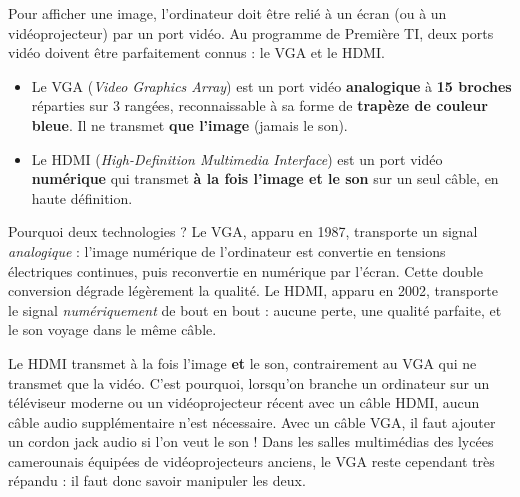 \documentclass[11pt]{article}
\newcommand{\cle}[1]{{\popxbold\color{popdark}#1}}
\newcounter{popsec}
\newcounter{popsub}
\newcommand{\courssub}[1]{%
  \stepcounter{popsub}%
  \par\vspace{9pt}\noindent{\popxbold\fontsize{11.5}{13}\selectfont\color{popink}{\color{poporange}\thepopsec.\thepopsub}\hspace{6pt}#1}\par\nopagebreak\vspace{4pt}
}
\begin{document}
\courssub{Les ports vidéo : VGA et HDMI}

Pour afficher une image, l'ordinateur doit être relié à un écran (ou à un vidéoprojecteur) par un \cle{port vidéo}. Au programme de Première TI, deux ports vidéo doivent être parfaitement connus : le VGA et le HDMI.

\begin{definition}
\begin{itemize}
  \item Le \cle{VGA} (\emph{Video Graphics Array}) est un port vidéo \textbf{analogique} à \textbf{15 broches} réparties sur 3 rangées, reconnaissable à sa forme de \textbf{trapèze de couleur bleue}. Il ne transmet \textbf{que l'image} (jamais le son).
  \item Le \cle{HDMI} (\emph{High-Definition Multimedia Interface}) est un port vidéo \textbf{numérique} qui transmet \textbf{à la fois l'image et le son} sur un seul câble, en haute définition.
\end{itemize}
\end{definition}

Pourquoi deux technologies ? Le VGA, apparu en 1987, transporte un signal \emph{analogique} : l'image numérique de l'ordinateur est convertie en tensions électriques continues, puis reconvertie en numérique par l'écran. Cette double conversion dégrade légèrement la qualité. Le HDMI, apparu en 2002, transporte le signal \emph{numériquement} de bout en bout : aucune perte, une qualité parfaite, et le son voyage dans le même câble.

\begin{savaistu}
Le HDMI transmet à la fois l'image \textbf{et} le son, contrairement au VGA qui ne transmet que la vidéo. C'est pourquoi, lorsqu'on branche un ordinateur sur un téléviseur moderne ou un vidéoprojecteur récent avec un câble HDMI, aucun câble audio supplémentaire n'est nécessaire. Avec un câble VGA, il faut ajouter un cordon jack audio si l'on veut le son ! Dans les salles multimédias des lycées camerounais équipées de vidéoprojecteurs anciens, le VGA reste cependant très répandu : il faut donc savoir manipuler les deux.
\end{savaistu}
\end{document}
